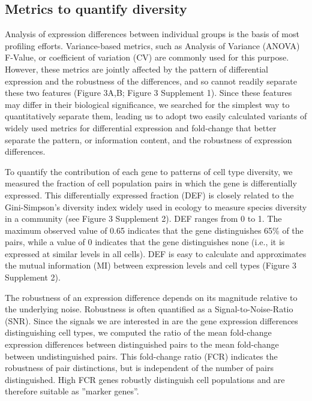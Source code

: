 \subsection{Metrics to quantify diversity}
Analysis of expression differences between individual groups is the basis of most profiling efforts. Variance-based metrics, such as Analysis of Variance (ANOVA) F-Value, or coefficient of variation (CV) are commonly used for this purpose. However, these metrics are jointly affected by the pattern of differential expression and the robustness of the differences, and so cannot readily separate these two features (Figure 3A,B; Figure 3 Supplement 1). Since these features may differ in their biological significance, we searched for the simplest way to quantitatively separate them, leading us to adopt two easily calculated variants of widely used metrics for differential expression and fold-change that better separate the pattern, or information content, and the robustness of expression differences.

To quantify the contribution of each gene to patterns of cell type diversity, we measured the fraction of cell population pairs in which the gene is differentially expressed. This differentially expressed fraction (DEF) is closely related to the Gini-Simpson's diversity index \citep{Simpson_1949} widely used in ecology to measure species diversity in a community (see Figure 3 Supplement 2). DEF ranges from 0 to 1. The maximum observed value of 0.65 indicates that the gene distinguishes 65\% of the pairs, while a value of 0 indicates that the gene distinguishes none (i.e., it is expressed at similar levels in all cells). DEF is easy to calculate and approximates the mutual information (MI) between expression levels and cell types (Figure 3 Supplement 2). 

The robustness of an expression difference depends on its magnitude relative to the underlying noise. Robustness is often quantified as a Signal-to-Noise-Ratio (SNR). Since the signals we are interested in are the gene expression differences distinguishing cell types, we computed the ratio of the mean fold-change expression differences between distinguished pairs to the mean fold-change between undistinguished pairs. This fold-change ratio (FCR) indicates the robustness of pair distinctions, but is independent of the number of pairs distinguished. High FCR genes robustly distinguish cell populations and are therefore suitable as ”marker genes”. %

